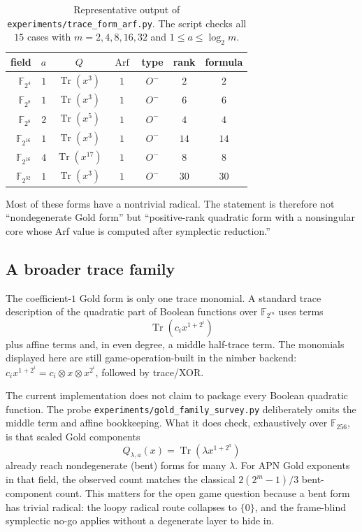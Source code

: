 \documentclass[11pt]{article}
\theoremstyle{plain}
\theoremstyle{definition}
\newcommand{\F}{\mathbb{F}}
\newcommand{\Tr}{\operatorname{Tr}}
\newcommand{\Arf}{\operatorname{Arf}}
\newcommand{\nimmul}{\otimes}
\begin{document}
\begin{table}[h]
\centering
\begin{tabular}{rrccccc}
\toprule
field & $a$ & $Q$ & $\Arf$ & type & rank & formula \\
\midrule
$\F_{2^{4}}$  & $1$ & $\Tr(x^3)$    & $1$ & $O^-$ & $2$  & $2$ \\
$\F_{2^{8}}$  & $1$ & $\Tr(x^3)$    & $1$ & $O^-$ & $6$  & $6$ \\
$\F_{2^{8}}$  & $2$ & $\Tr(x^5)$    & $1$ & $O^-$ & $4$  & $4$ \\
$\F_{2^{16}}$ & $1$ & $\Tr(x^3)$    & $1$ & $O^-$ & $14$ & $14$ \\
$\F_{2^{16}}$ & $4$ & $\Tr(x^{17})$ & $1$ & $O^-$ & $8$  & $8$ \\
$\F_{2^{32}}$ & $1$ & $\Tr(x^3)$    & $1$ & $O^-$ & $30$ & $30$ \\
\bottomrule
\end{tabular}
\caption{Representative output of \texttt{experiments/trace\_form\_arf.py}.
The script checks all $15$ cases with $m=2,4,8,16,32$ and
$1\leq a\leq \log_2 m$.}
\label{tab:gold}
\end{table}

Most of these forms have a nontrivial radical. The statement is therefore not
``nondegenerate Gold form'' but ``positive-rank quadratic form with a
nonsingular core whose Arf value is computed after symplectic reduction.''

\subsection{A broader trace family}

The coefficient-$1$ Gold form is only one trace monomial. A standard trace
description of the quadratic part of Boolean functions over $\F_{2^m}$ uses
terms
\[
  \Tr(c_i x^{1+2^i})
\]
plus affine terms and, in even degree, a middle half-trace term. The monomials
displayed here are still game-operation-built in the nimber backend:
$c_i x^{1+2^i}=c_i\nimmul x\nimmul x^{2^i}$, followed by trace/XOR.

The current implementation does not claim to package every Boolean quadratic
function. The probe \texttt{experiments/gold\_family\_survey.py} deliberately
omits the middle term and affine bookkeeping. What it does check, exhaustively
over $\F_{256}$, is that scaled Gold components
\[
  Q_{\lambda,a}(x)=\Tr(\lambda x^{1+2^a})
\]
already reach nondegenerate (bent) forms for many $\lambda$. For APN Gold
exponents in that field, the observed count matches the classical
$2(2^m-1)/3$ bent-component count. This matters for the open game question
because a bent form has trivial radical: the loopy radical route collapses to
$\{0\}$, and the frame-blind symplectic no-go applies without a degenerate
layer to hide in.
\end{document}

